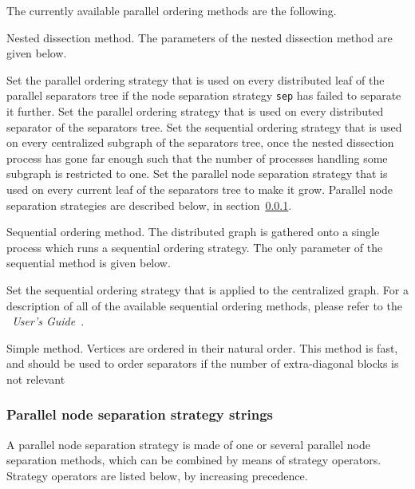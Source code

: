 The currently available parallel ordering methods are the following.
\begin{itemize}
\iteme[{\tt n}]
Nested dissection method. The parameters of the nested dissection
method are given below.
\begin{itemize}
\iteme[{\tt ole=}{\it strat}]
Set the parallel ordering strategy that is used on every distributed
leaf of the parallel separators tree if the node separation strategy
{\tt sep} has failed to separate it further.
\iteme[{\tt ose=}{\it strat}]
Set the parallel ordering strategy that is used on every distributed
separator of the separators tree.
\iteme[{\tt osq=}{\it strat}]
Set the sequential ordering strategy that is used on every centralized
subgraph of the separators tree, once the nested dissection process has
gone far enough such that the number of processes handling some
subgraph is restricted to one.
\iteme[{\tt sep=}{\it strat}]
Set the parallel node separation strategy that is used on every
current leaf of the separators tree to make it grow. Parallel
node separation strategies are described below, in
section~\ref{sec-lib-format-pnsep}.
\end{itemize}
\iteme[{\tt q}]
Sequential ordering method. The distributed graph is gathered onto a
single process which runs a sequential ordering strategy. The only
parameter of the sequential method is given below.
\begin{itemize}
\iteme[{\tt strat=}{\it strat}]
Set the sequential ordering strategy that is applied to the
centralized graph. For a description of all of the available
sequential ordering methods, please refer to the
{\it\scotch\ User's Guide}~\scotchcitesuser.
\end{itemize}
\iteme[{\tt s}]
Simple method. Vertices are ordered in their natural order. This
method is fast, and should be used to order separators if the number
of extra-diagonal blocks is not relevant
\end{itemize}

\subsubsection{Parallel node separation strategy strings}
\label{sec-lib-format-pnsep}

A parallel node separation strategy is made of one or several parallel
node separation methods, which can be combined by means of strategy
operators. Strategy operators are listed below, by increasing
precedence.

